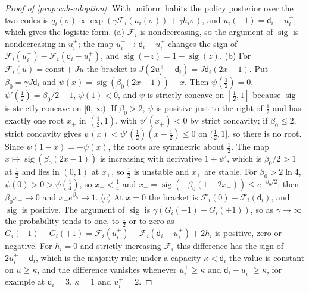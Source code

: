 \begin{proof}[Proof of \cref{prop:coh-adoption}]
With uniform habits the policy posterior over the two codes is $q_i(\sigma)\propto\exp(\gamma\mathcal F_i(u_i(\sigma))+\gamma h_i\sigma)$, and $u_i(-1)=\mathsf d_i-u^+_i$, which gives the logistic form. (a) $\mathcal F_i$ is nondecreasing, so the argument of $\operatorname{sig}$ is nondecreasing in $u^+_i$; the map $u^+_i\mapsto\mathsf d_i-u^+_i$ changes the sign of $\mathcal F_i(u^+_i)-\mathcal F_i(\mathsf d_i-u^+_i)$, and $\operatorname{sig}(-z)=1-\operatorname{sig}(z)$. (b) For $\mathcal F_i(u)=\mathrm{const}+Ju$ the bracket is $J(2u^+_i-\mathsf d_i)=J\mathsf d_i(2x-1)$. Put $\beta_0=\gamma J\mathsf d_i$ and $\psi(x)=\operatorname{sig}(\beta_0(2x-1))-x$. Then $\psi(\frac12)=0$, $\psi'(\frac12)=\beta_0/2-1$, $\psi(1)<0$, and $\psi$ is strictly concave on $[\frac12,1]$ because $\operatorname{sig}$ is strictly concave on $[0,\infty)$. If $\beta_0>2$, $\psi$ is positive just to the right of $\frac12$ and has exactly one root $x_+$ in $(\frac12,1)$, with $\psi'(x_+)<0$ by strict concavity; if $\beta_0\le2$, strict concavity gives $\psi(x)<\psi'(\frac12)(x-\frac12)\le0$ on $(\frac12,1]$, so there is no root. Since $\psi(1-x)=-\psi(x)$, the roots are symmetric about $\frac12$. The map $x\mapsto\operatorname{sig}(\beta_0(2x-1))$ is increasing with derivative $1+\psi'$, which is $\beta_0/2>1$ at $\frac12$ and lies in $(0,1)$ at $x_\pm$, so $\frac12$ is unstable and $x_\pm$ are stable. For $\beta_0>2\ln4$, $\psi(0)>0>\psi(\frac14)$, so $x_-<\frac14$ and $x_-=\operatorname{sig}(-\beta_0(1-2x_-))\le e^{-\beta_0/2}$; then $\beta_0x_-\to0$ and $x_-e^{\beta_0}\to1$. (c) At $x=0$ the bracket is $\mathcal F_i(0)-\mathcal F_i(\mathsf d_i)$, and $\operatorname{sig}$ is positive. The argument of $\operatorname{sig}$ is $\gamma(G_i(-1)-G_i(+1))$, so as $\gamma\to\infty$ the probability tends to one, to $\frac12$ or to zero as $G_i(-1)-G_i(+1)=\mathcal F_i(u^+_i)-\mathcal F_i(\mathsf d_i-u^+_i)+2h_i$ is positive, zero or negative. For $h_i=0$ and strictly increasing $\mathcal F_i$ this difference has the sign of $2u^+_i-\mathsf d_i$, which is the majority rule; under a capacity $\kappa<\mathsf d_i$ the value is constant on $u\ge\kappa$, and the difference vanishes whenever $u^+_i\ge\kappa$ and $\mathsf d_i-u^+_i\ge\kappa$, for example at $\mathsf d_i=3$, $\kappa=1$ and $u^+_i=2$.
\end{proof}

